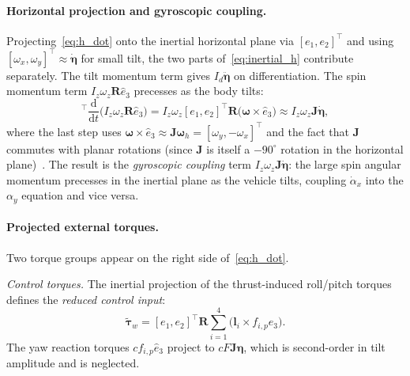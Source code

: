 \paragraph{Horizontal projection and gyroscopic coupling.}
Projecting~\eqref{eq:h_dot} onto the inertial horizontal plane via
$[e_1,e_2]^{\top}$ and using $[\omega_x, \omega_y]^{\top} \approx
\dot{\boldsymbol{\eta}}$ for small tilt, the two parts
of~\eqref{eq:inertial_h} contribute separately.  The tilt momentum term
gives $I_d\ddot{\boldsymbol{\eta}}$ on differentiation.  The spin momentum
term $I_z\omega_z\boldsymbol{R}\hat{e}_3$ precesses as the body tilts:
\begin{equation}
    [e_1,e_2]^{\top}
    \frac{\mathrm{d}}{\mathrm{d}t}
    \bigl(I_z\omega_z\boldsymbol{R}\hat{e}_3\bigr)
    = I_z\omega_z[e_1,e_2]^{\top}
      \boldsymbol{R}\bigl(\boldsymbol{\omega}\times\hat{e}_3\bigr)
    \approx I_z\omega_z\boldsymbol{J}\dot{\boldsymbol{\eta}},
    \label{eq:gyro_proj}
\end{equation}
where the last step uses $\boldsymbol{\omega}\times\hat{e}_3 \approx
\boldsymbol{J}\boldsymbol{\omega}_h = [\omega_y,-\omega_x]^{\top}$ and the
fact that $\boldsymbol{J}$ commutes with planar rotations (since $\boldsymbol{J}$
is itself a $-90^{\circ}$ rotation in the horizontal
plane)~\cite{bai2022splitflyerair}.  The result is the \emph{gyroscopic
coupling} term $I_z\omega_z\boldsymbol{J}\dot{\boldsymbol{\eta}}$: the
large spin angular momentum precesses in the inertial plane as the vehicle
tilts, coupling $\dot{\alpha}_x$ into the $\alpha_y$ equation and vice
versa.

\paragraph{Projected external torques.}
Two torque groups appear on the right side of~\eqref{eq:h_dot}.

\noindent\textit{Control torques.}
The inertial projection of the thrust-induced roll/pitch torques defines the
\emph{reduced control input}:
\begin{equation}
    \tilde{\boldsymbol{\tau}}_w
        = [e_1,e_2]^{\top}\boldsymbol{R}
          \sum_{i=1}^{4}\bigl(\boldsymbol{l}_i\times f_{i,p}\hat{e}_3\bigr).
    \label{eq:tau_w_reduced}
\end{equation}
The yaw reaction torques $cf_{i,p}\hat{e}_3$ project to $cF\boldsymbol{J}\boldsymbol{\eta}$,
which is second-order in tilt amplitude and is neglected.

